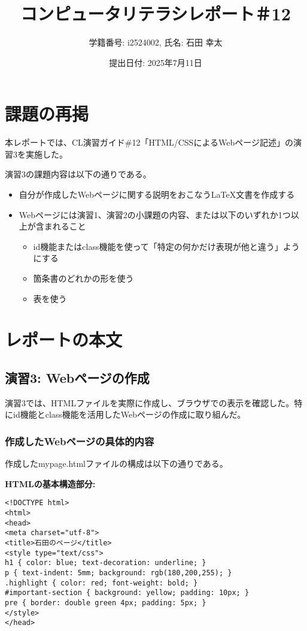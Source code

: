 \documentclass[12pt,a4j]{jarticle}
\begin{document}
\title{コンピュータリテラシレポート＃12}
\author{学籍番号: i2524002, 氏名: 石田 幸太}
\date{提出日付: 2025年7月11日}
\maketitle

\section{課題の再掲}

本レポートでは、CL演習ガイド\#12「HTML/CSSによるWebページ記述」の演習3を実施した。

演習3の課題内容は以下の通りである。
\begin{itemize}
\item 自分が作成したWebページに関する説明をおこなうLaTeX文書を作成する
\item Webページには演習1、演習2の小課題の内容、または以下のいずれか1つ以上が含まれること
\begin{itemize}
\item id機能またはclass機能を使って「特定の何かだけ表現が他と違う」ようにする
\item 箇条書のどれかの形を使う
\item 表を使う
\end{itemize}
\end{itemize}

\section{レポートの本文}

\subsection{演習3: Webページの作成}

演習3では、HTMLファイルを実際に作成し、ブラウザでの表示を確認した。特にid機能とclass機能を活用したWebページの作成に取り組んだ。

\subsubsection{作成したWebページの具体的内容}

作成したmypage.htmlファイルの構成は以下の通りである。

\textbf{HTMLの基本構造部分:}
\begin{verbatim}
<!DOCTYPE html>
<html>
<head>
<meta charset="utf-8">
<title>石田のページ</title>
<style type="text/css">
h1 { color: blue; text-decoration: underline; }
p { text-indent: 5mm; background: rgb(180,200,255); }
.highlight { color: red; font-weight: bold; }
#important-section { background: yellow; padding: 10px; }
pre { border: double green 4px; padding: 5px; }
</style>
</head>
\end{verbatim}
\end{document}
